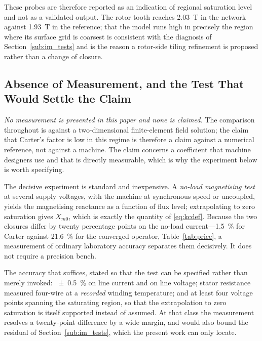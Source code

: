 \documentclass[10pt,a4paper,twocolumn]{article}
\theoremstyle{plain}
\theoremstyle{remark}
\begin{document}
These probes are therefore reported as an indication of regional
saturation level and not as a validated output. The rotor tooth reaches
\SI{2.03}{\tesla} in the network against \SI{1.93}{\tesla} in the
reference; that the model runs high in precisely the region where its
surface grid is coarsest is consistent with the diagnosis of
Section~\ref{sub:im_tests} and is the reason a rotor-side tiling
refinement is proposed rather than a change of closure.

\subsection{Absence of Measurement, and the Test That Would Settle the Claim}
\label{sub:measurement}

\emph{No measurement is presented in this paper and none is claimed.}
The comparison throughout is against a two-dimensional finite-element
field solution; the claim that Carter's factor is low in this regime is
therefore a claim against a numerical reference, not against a machine.
The claim concerns a coefficient that machine designers use and that is
directly measurable, which is why the experiment below is worth
specifying.

The decisive experiment is standard and inexpensive. A \emph{no-load
magnetising test} at several supply voltages, with the machine at
synchronous speed or uncoupled, yields the magnetising reactance as a
function of flux level; extrapolating to zero saturation gives $X_{m0}$,
which is exactly the quantity of \eqref{eq:kcdef}. Because the two
closures differ by twenty percentage points on the no-load
current---\SI{+1.5}{\percent} for Carter against \SI{+21.6}{\percent}
for the converged operator, Table~\ref{tab:price}, a measurement of
ordinary laboratory accuracy separates them decisively. It does not
require a precision bench.

The accuracy that suffices, stated so that the test can be specified
rather than merely invoked: \SI{\pm0.5}{\percent} on line current and on
line voltage; stator resistance measured four-wire at a
\emph{recorded} winding temperature; and at least four voltage points
spanning the saturating region, so that the extrapolation to zero
saturation is itself supported instead of assumed. At that class the
measurement resolves a twenty-point difference by a wide margin, and
would also bound the residual of Section~\ref{sub:im_tests}, which the
present work can only locate.
\end{document}
